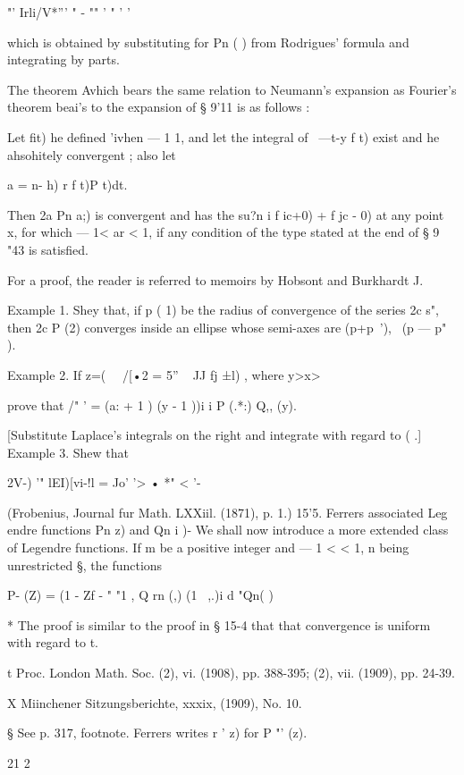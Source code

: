 {{{"' Irli/V*''' " - "" ' " ' ' 



which is obtained by substituting for Pn ( ) from Rodrigues' formula and 
integrating by parts. 

The theorem Avhich bears the same relation to Neumann's expansion as Fourier's 
theorem beai's to the expansion of § 9'11 is as follows : 

Let fit) he defined 'ivhen — 1    1, and let the integral of  \ —t-y f t) exist and he 
ahsohitely convergent ; also let 

a  =  n- h) r f t)P  t)dt. 

Then 2a Pn a;) is convergent and has the su?n i f ic+0) + f jc - 0)  at any point x, for 
which — 1< ar < 1, if any condition of the type stated at the end of § 9 "43 is satisfied. 

For a proof, the reader is referred to memoirs by Hobsont and Burkhardt J. 

Example 1. Shey that, if p (  1) be the radius of convergence of the series 2c s", then 
2c P (2) converges inside an ellipse whose semi-axes are   (p+p~'), \ (p — p" ). 

Example 2. If z=( \ \  /[•2 = 5'' ~ JJ fj ±l) , where y>x>\, 

prove that /" '   =  (a: + 1 ) (y - 1 ))i i P  (.*:) Q,, (y). 

[Substitute Laplace's integrals on the right and integrate with regard to ( .] 
Example 3. Shew that 

2V-) '"  lEI)[vi-!l = Jo'    '>  •   *" < '- 

(Frobenius, Journal fur Math. LXXiil. (1871), p. 1.) 
15'5. Ferrers associated Leg endre functions Pn  z) and Qn i )- 
We shall now introduce a more extended class of Legendre functions. 
If m be a positive integer and — 1 <   < 1, n being unrestricted §, the 
functions 

P- (Z) = (1 - Zf -  " "1 , Q rn (,)   (1 \  ,.)i   d "Qn( ) 

* The proof is similar to the proof in § 15-4 that that convergence is uniform with regard to t. 

t Proc. London Math. Soc. (2), vi. (1908), pp. 388-395; (2), vii. (1909), pp. 24-39. 

X Miinchener Sitzungsberichte, xxxix, (1909), No. 10. 

§ See p. 317, footnote. Ferrers writes r '   z) for P "' (z). 

21 2 



}}}
